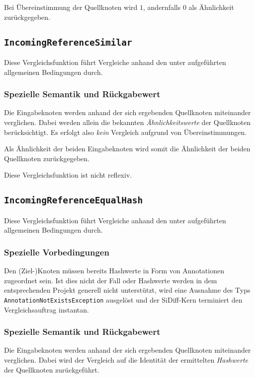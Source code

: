 Bei Übereinstimmung der Quellknoten wird $1$, andernfalls $0$ als Ähnlichkeit zurückgegeben.


%
%
\subsection{\texttt{IncomingReferenceSimilar}}
Diese Vergleichsfunktion führt Vergleiche anhand den unter\mylinebreak{} aufgeführten allgemeinen Bedingungen durch.

\subsubsection*{Spezielle Semantik und Rückgabewert}
Die Eingabeknoten werden anhand der sich ergebenden Quellknoten miteinander verglichen. Dabei werden allein die bekannten \emph{Ähnlichkeitswerte} der Quellknoten berücksichtigt. Es erfolgt also \emph{kein} Vergleich aufgrund von Übereinstimmungen.

Als Ähnlichkeit der beiden Eingabeknoten wird somit die Ähnlichkeit der beiden Quellknoten zurückgegeben.

 Diese Vergleichsfunktion ist nicht reflexiv.


\newpage
%
%
\subsection{\texttt{IncomingReferenceEqualHash}}
Diese Vergleichsfunktion führt Vergleiche anhand den unter\mylinebreak{} aufgeführten allgemeinen Bedingungen durch.

\subsubsection*{Spezielle Vorbedingungen}
Den (Ziel-)Knoten müssen bereits Hashwerte in Form von Annotationen zugeordnet sein. Ist dies nicht der Fall oder Hashwerte werden in dem entsprechenden Projekt generell nicht unterstützt, wird eine Ausnahme des Typs \texttt{AnnotationNotExistsException} ausgelöst und der SiDiff-Kern terminiert den Vergleichsauftrag instantan.

\subsubsection*{Spezielle Semantik und Rückgabewert}
Die Eingabeknoten werden anhand der sich ergebenden Quellknoten miteinander verglichen. Dabei wird der Vergleich auf die Identität der ermittelten \emph{Hashwerte} der Quellknoten zurückgeführt.

